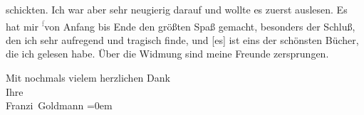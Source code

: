                schickten. Ich war aber sehr neugierig darauf und wollte es zuerst auslesen. Es hat
               mir \substVorne{}\textsuperscript{\textcolor{gray}{f}}\substDazwischen{}v\substHinten{}on Anfang bis Ende den größten Spaß gemacht, besonders der Schluß, den ich
               sehr aufregend und tragisch finde, und {[}es{]} ist eins der schönsten
               Bücher, die ich gelesen habe. Über die Widmung sind meine \label{T_L03539-1v}\label{T_L03539-1} Freunde zersprungen.\pend
           
\pstart
           {\pb}Mit nochmals vielem herzlichen Dank {\\[\baselineskip]}Ihre {\\[\baselineskip]}\spacefill\mbox{Franzi Goldmann}\pend
           \leftskip=0em{}\endnumbering{}  \newcommand{\dateiname}{L03539}\newcommand{\titel}{Franziska Goldmann an Arthur Schnitzler, [Ende Oktober 1925?]}\newcommand{\editorInnen}{Martin Anton Müller und Laura Untner}

